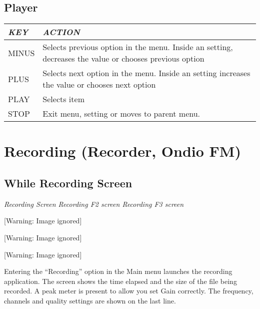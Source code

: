\subsection{Player}

\begin{tabular}[c]{|p{3.27cm}|p{13.317cm}|}
\hline
{\centering\bfseries\itshape
KEY
\par}
&
{\centering\bfseries\itshape
ACTION
\par}
\\\hline
{\centering
MINUS
\par}
&
Selects previous option in the menu. Inside an setting, decreases the
value or chooses previous option
\\\hline
{\centering
PLUS
\par}
&
Selects next option in the menu. Inside an setting increases the value
or chooses next option
\\\hline
{\centering
PLAY
\par}
&
Selects item
\\\hline
{\centering
STOP
\par}
&
Exit menu, setting or moves to parent menu.
\\\hline
\end{tabular}

\section{\label{ref:Recording}Recording (Recorder, Ondio FM)}
\subsection{\label{ref:Whilerecordingscreen}While Recording Screen}
{\centering\itshape
Recording Screen  Recording F2 screen  Recording F3 screen
\par}

\begin{center}
 [Warning: Image ignored] %

\end{center}
\begin{center}
 [Warning: Image ignored] %

\end{center}
\begin{center}
 [Warning: Image ignored] %

\end{center}
Entering the ``Recording'' option in the Main menu launches the
recording application. The screen shows the time elapsed and the size
of the file being recorded. A peak meter is present to allow you set
Gain correctly.  The frequency, channels and quality settings are shown
on the last line.

